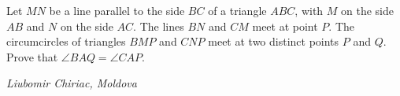 Let $ MN$ be a line parallel to the side $ BC$ of a triangle $ ABC$, with $ M$ on the side $ AB$ and $ N$ on the side $ AC$. The lines $ BN$ and $ CM$ meet at point $ P$. The circumcircles of triangles $ BMP$ and $ CNP$ meet at two distinct points $ P$ and $ Q$. Prove that $ \angle BAQ = \angle CAP$.

\textit{Liubomir Chiriac, Moldova}